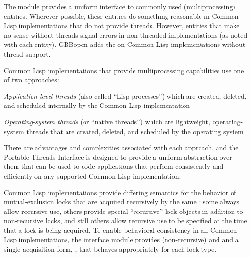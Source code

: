 
%
%
The  module provides a uniform interface to commonly
used  (multiprocessing) entities.  Wherever possible, these
entities do something reasonable in Common Lisp implementations that do not
provide threads. However, entities that make no sense without threads signal
errors in non-threaded implementations (as noted with each entity). GBBopen
adds the   on Common Lisp
implementations without thread support.


Common Lisp implementations that provide multiprocessing capabilities use one
of two approaches:
\begin{tightitemize}
\item \textit{Application-level threads\/} (also called ``Lisp processes'') which are
  created, deleted, and scheduled internally by the Common Lisp implementation
\item \textit{Operating-system threads\/} (or ``native threads'') which are
  lightweight, operating-system threads that are created, deleted, and
  scheduled by the operating system
\end{tightitemize}

There are advantages and complexities associated with each approach, and the
Portable Threads Interface is designed to provide a uniform abstraction over
them that can be used to code applications that perform consistently and
efficiently on any supported Common Lisp implementation.


Common Lisp implementations provide differing semantics for the behavior of
mutual-exclusion locks that are acquired recursively by the same
: some always allow recursive use, others provide special
``recursive'' lock objects in addition to non-recursive locks, and still
others allow recursive use to be specified at the time that a lock is being
acquired.  To enable behavioral consistency in all Common Lisp
implementations, the  interface module provides
(non-recursive)  and  and a single
acquisition form, \textbf{}, that behaves
appropriately for each lock type.

